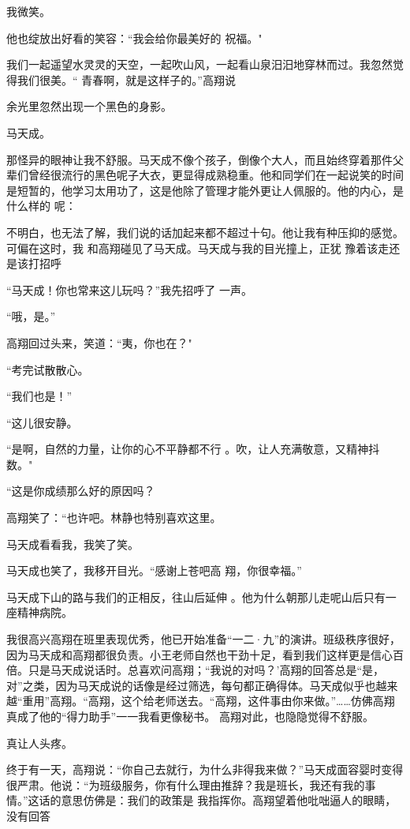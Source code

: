 \documentclass{article}
\begin{document}
\newpage

我微笑。 

他也绽放出好看的笑容：“我会给你最美好的
祝福。" 

我们一起遥望水灵灵的天空，一起吹山风，一起看山泉汨汨地穿林而过。我忽然觉得我们很美。“
青春啊，就是这样子的。”高翔说 


余光里忽然出现一个黑色的身影。 


马天成。 

那怪异的眼神让我不舒服。马天成不像个孩子，倒像个大人，而且始终穿着那件父辈们曾经很流行的黑色呢子大衣，更显得成熟稳重。他和同学们在一起说笑的时间是短暂的，他学习太用功了，这是他除了管理才能外更让人佩服的。他的内心，是什么样的
呢： 

不明白，也无法了解，我们说的话加起来都不超过十句。他让我有种压抑的感觉。可偏在这时，我
\newpage
和高翔碰见了马天成。马天成与我的目光撞上，正犹
豫着该走还是该打招呼 

“马天成！你也常来这儿玩吗？”我先招呼了
一声。 


“哦，是。” 


高翔回过头来，笑道：“夷，你也在？" 


“考完试散散心。 


“我们也是！” 


“这儿很安静。 

“是啊，自然的力量，让你的心不平静都不行
。吹，让人充满敬意，又精神抖数。" 


“这是你成绩那么好的原因吗？ 

\newpage

高翔笑了：“也许吧。林静也特别喜欢这里。


马天成看看我，我笑了笑。 

马天成也笑了，我移开目光。“感谢上苍吧高
翔，你很幸福。” 

马天成下山的路与我们的正相反，往山后延伸
。他为什么朝那儿走呢山后只有一座精神病院。 

我很高兴高翔在班里表现优秀，他已开始准备“一二·九”的演讲。班级秩序很好，因为马天成和高翔都很负责。小王老师自然也干劲十足，看到我们这样更是信心百倍。只是马天成说话时。总喜欢问高翔；“我说的对吗？'高翔的回答总是“是，对”之类，因为马天成说的话像是经过筛选，每句都正确得体。马天成似乎也越来越“重用”高翔。“高翔，这个给老师送去。“高翔，这件事由你来做。”……仿佛高翔真成了他的“得力助手”一一我看更像秘书。
高翔对此，也隐隐觉得不舒服。 

\newpage


真让人头疼。 

终于有一天，高翔说：“你自己去就行，为什么非得我来做？”马天成面容婴时变得很严肃。他说：“为班级服务，你有什么理由推辞？我是班长，我还有我的事情。”这话的意思仿佛是：我们的政策是
我指挥你。高翔望着他吡咄逼人的眼睛，没有回答 
\end{document}
